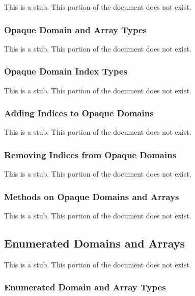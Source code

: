 This is a stub.  This portion of the document does not exist.

\subsubsection{Opaque Domain and Array Types}
\label{Opaque_Domain_and_Array_Types}

This is a stub.  This portion of the document does not exist.

\subsubsection{Opaque Domain Index Types}
\label{Opaque_Domain_Index_Types}

This is a stub.  This portion of the document does not exist.

\subsubsection{Adding Indices to Opaque Domains}
\label{Adding_Indices_to_Opaque_Domains}

This is a stub.  This portion of the document does not exist.

\subsubsection{Removing Indices from Opaque Domains}
\label{Removing_Indices_from_Opaque_Domains}

This is a stub.  This portion of the document does not exist.

\subsubsection{Methods on Opaque Domains and Arrays}
\label{Methods_on_Opaque_Domains_and_Arrays}

This is a stub.  This portion of the document does not exist.

\subsection{Enumerated Domains and Arrays}
\label{Enumerated_Domains_and_Arrays}

This is a stub.  This portion of the document does not exist.

\subsubsection{Enumerated Domain and Array Types}
\label{Enumerated_Domain_and_Array_Types}

